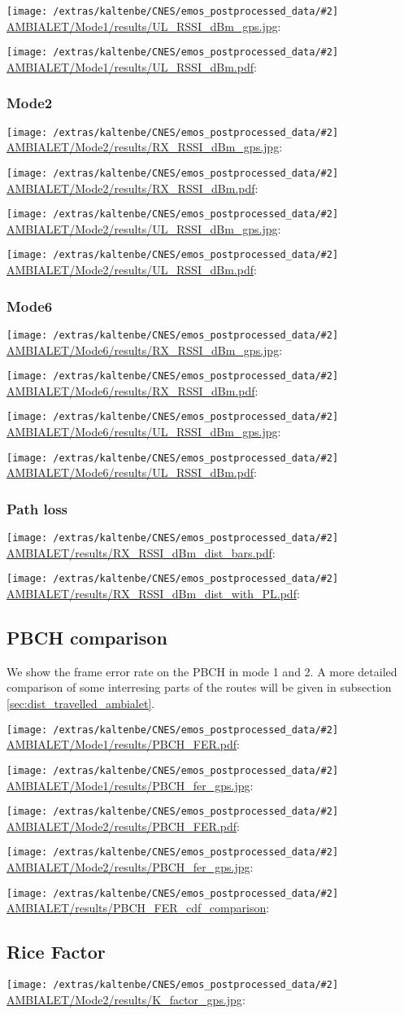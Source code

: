 \documentclass[a4paper,10pt]{article}
\newcommand{\printfile}[2][]{
 \begin{minipage}{8cm}
  \centering
  \texttt{[image: /extras/kaltenbe/CNES/emos\_postprocessed\_data/\#2]}
  \url{#2}: #1

 \end{minipage}
}
\begin{document}
\printfile{AMBIALET/Mode1/results/UL_RSSI_dBm_gps.jpg}
\printfile{AMBIALET/Mode1/results/UL_RSSI_dBm.pdf}

\subsubsection{Mode2}

\printfile{AMBIALET/Mode2/results/RX_RSSI_dBm_gps.jpg}
\printfile{AMBIALET/Mode2/results/RX_RSSI_dBm.pdf}

\printfile{AMBIALET/Mode2/results/UL_RSSI_dBm_gps.jpg}
\printfile{AMBIALET/Mode2/results/UL_RSSI_dBm.pdf}

\subsubsection{Mode6}
\printfile{AMBIALET/Mode6/results/RX_RSSI_dBm_gps.jpg}
\printfile{AMBIALET/Mode6/results/RX_RSSI_dBm.pdf}

\printfile{AMBIALET/Mode6/results/UL_RSSI_dBm_gps.jpg}
\printfile{AMBIALET/Mode6/results/UL_RSSI_dBm.pdf}

\subsubsection{Path loss}

\printfile{AMBIALET/results/RX_RSSI_dBm_dist_bars.pdf}
\printfile{AMBIALET/results/RX_RSSI_dBm_dist_with_PL.pdf}


\subsection{PBCH comparison}
We show the frame error rate on the PBCH in mode 1 and 2. A more detailed comparison of some interresing parts of the routes will be given in subsection \ref{sec:dist_travelled_ambialet}.

\printfile{AMBIALET/Mode1/results/PBCH_FER.pdf}
\printfile{AMBIALET/Mode1/results/PBCH_fer_gps.jpg}

\printfile{AMBIALET/Mode2/results/PBCH_FER.pdf}
\printfile{AMBIALET/Mode2/results/PBCH_fer_gps.jpg}

\printfile{AMBIALET/results/PBCH_FER_cdf_comparison}

\subsection{Rice Factor}

\printfile{AMBIALET/Mode2/results/K_factor_gps.jpg}
\end{document}
